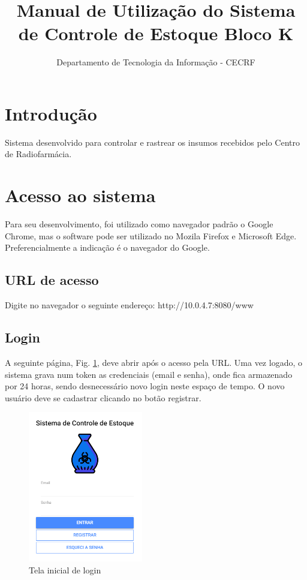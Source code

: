 \documentclass[letterpaper, 12 pt]{article}
\begin{document}
\title{Manual de Utilização do Sistema de Controle de Estoque Bloco K}
\author{Departamento de Tecnologia da Informação - CECRF}
\maketitle
\pagestyle{empty}
\newpage


\tableofcontents
\newpage

\section{Introdução}
Sistema desenvolvido para controlar e rastrear os insumos recebidos pelo Centro de Radiofarmácia.
\newpage


\section{Acesso ao sistema}
Para seu desenvolvimento, foi utilizado como navegador padrão o Google Chrome, mas o software pode ser utilizado 
no Mozila Firefox e Microsoft Edge. Preferencialmente a indicação é o navegador do Google.
\subsection{URL de acesso}
Digite no navegador o seguinte endereço: http://10.0.4.7:8080/www
\subsection{Login}
A seguinte página, Fig. \ref{figura:login1}, deve abrir após o acesso pela URL. Uma vez logado, o sistema grava num token as credenciais (email e senha), onde fica armazenado por 24 horas, sendo desnecessário novo login neste espaço de tempo.
O novo usuário deve se cadastrar clicando no botão registrar.  

\begin{figure}[h]


\centering %
\includegraphics[width=5cm]{imagens/login1.PNG} %
\caption{Tela inicial de login}
\label{figura:login1}
\end{figure}
\newpage
\end{document}
